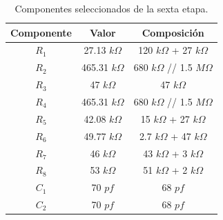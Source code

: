 \begin{multicols}{2}
\begin{table}[H]
\centering
\begin{tabular}{ccc}
\hline
\multicolumn{1}{c}{Componente} & \multicolumn{1}{c}{Valor} & Composición \\ \hline
$R_1$                           & 27.13 $k\Omega$                      & 120 $k\Omega$ + 27 $k\Omega$     \\
$R_2$                           & 465.31 $k\Omega$                    & 680 $k\Omega$ // 1.5 $M\Omega$  \\
$R_3$                           & 47 $k\Omega$                        & 47 $k\Omega$         \\
$R_4$                           & 465.31 $k\Omega$                    & 680 $k\Omega$ // 1.5 $M\Omega$  \\
$R_5$                           & 42.08 $k\Omega$                     & 15 $k\Omega$ + 27 $k\Omega$     \\
$R_6$                           & 49.77 $k\Omega$                     & 2.7 $k\Omega$ + 47 $k\Omega$    \\
$R_7$                           & 46 $k\Omega$                        & 43 $k\Omega$ + 3 $k\Omega$         \\
$R_8$                           & 53 $k\Omega$                        & 51 $k\Omega$ + 2 $k\Omega$         \\
$C_1$                           & 70 $pf$                       & 68 $pf$        \\
$C_2$                           & 70 $pf$                       & 68 $pf$  \\
\hline
\end{tabular}
\caption{Componentes seleccionados de la sexta etapa.}
\end{table}
\end{multicols}

